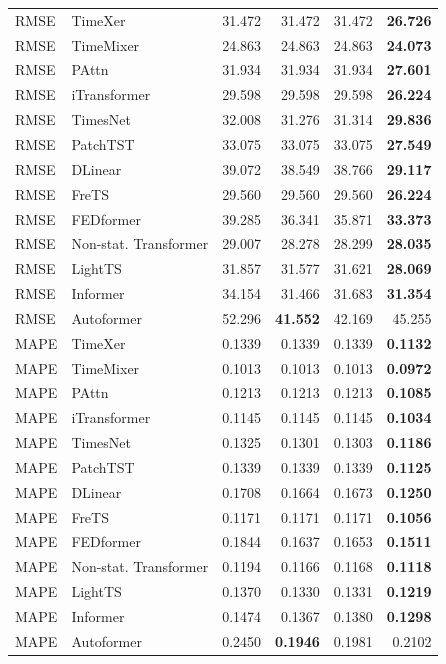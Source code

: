 \begin{longtable}{llrrrr}
\midrule
RMSE & TimeXer & 31.472 & 31.472 & 31.472 & \textbf{26.726} \\
RMSE & TimeMixer & 24.863 & 24.863 & 24.863 & \textbf{24.073} \\
RMSE & PAttn & 31.934 & 31.934 & 31.934 & \textbf{27.601} \\
RMSE & iTransformer & 29.598 & 29.598 & 29.598 & \textbf{26.224} \\
RMSE & TimesNet & 32.008 & 31.276 & 31.314 & \textbf{29.836} \\
RMSE & PatchTST & 33.075 & 33.075 & 33.075 & \textbf{27.549} \\
RMSE & DLinear & 39.072 & 38.549 & 38.766 & \textbf{29.117} \\
RMSE & FreTS & 29.560 & 29.560 & 29.560 & \textbf{26.224} \\
RMSE & FEDformer & 39.285 & 36.341 & 35.871 & \textbf{33.373} \\
RMSE & Non-stat. Transformer & 29.007 & 28.278 & 28.299 & \textbf{28.035} \\
RMSE & LightTS & 31.857 & 31.577 & 31.621 & \textbf{28.069} \\
RMSE & Informer & 34.154 & 31.466 & 31.683 & \textbf{31.354} \\
RMSE & Autoformer & 52.296 & \textbf{41.552} & 42.169 & 45.255 \\
\midrule
MAPE & TimeXer & 0.1339 & 0.1339 & 0.1339 & \textbf{0.1132} \\
MAPE & TimeMixer & 0.1013 & 0.1013 & 0.1013 & \textbf{0.0972} \\
MAPE & PAttn & 0.1213 & 0.1213 & 0.1213 & \textbf{0.1085} \\
MAPE & iTransformer & 0.1145 & 0.1145 & 0.1145 & \textbf{0.1034} \\
MAPE & TimesNet & 0.1325 & 0.1301 & 0.1303 & \textbf{0.1186} \\
MAPE & PatchTST & 0.1339 & 0.1339 & 0.1339 & \textbf{0.1125} \\
MAPE & DLinear & 0.1708 & 0.1664 & 0.1673 & \textbf{0.1250} \\
MAPE & FreTS & 0.1171 & 0.1171 & 0.1171 & \textbf{0.1056} \\
MAPE & FEDformer & 0.1844 & 0.1637 & 0.1653 & \textbf{0.1511} \\
MAPE & Non-stat. Transformer & 0.1194 & 0.1166 & 0.1168 & \textbf{0.1118} \\
MAPE & LightTS & 0.1370 & 0.1330 & 0.1331 & \textbf{0.1219} \\
MAPE & Informer & 0.1474 & 0.1367 & 0.1380 & \textbf{0.1298} \\
MAPE & Autoformer & 0.2450 & \textbf{0.1946} & 0.1981 & 0.2102 \\
\end{longtable}
\endgroup

